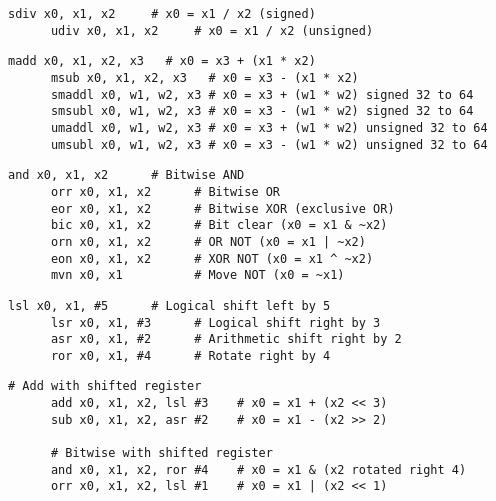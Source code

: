   \begin{definition}[Division]
    \begin{lstlisting}[language=arm]
      sdiv x0, x1, x2     # x0 = x1 / x2 (signed)
      udiv x0, x1, x2     # x0 = x1 / x2 (unsigned)
    \end{lstlisting}
  \end{definition}

  \begin{definition}
    \begin{lstlisting}[language=arm]
      madd x0, x1, x2, x3   # x0 = x3 + (x1 * x2)
      msub x0, x1, x2, x3   # x0 = x3 - (x1 * x2)
      smaddl x0, w1, w2, x3 # x0 = x3 + (w1 * w2) signed 32 to 64
      smsubl x0, w1, w2, x3 # x0 = x3 - (w1 * w2) signed 32 to 64
      umaddl x0, w1, w2, x3 # x0 = x3 + (w1 * w2) unsigned 32 to 64
      umsubl x0, w1, w2, x3 # x0 = x3 - (w1 * w2) unsigned 32 to 64
    \end{lstlisting}
  \end{definition}

  \begin{definition}
    \begin{lstlisting}[language=arm]
      and x0, x1, x2      # Bitwise AND
      orr x0, x1, x2      # Bitwise OR
      eor x0, x1, x2      # Bitwise XOR (exclusive OR)
      bic x0, x1, x2      # Bit clear (x0 = x1 & ~x2)
      orn x0, x1, x2      # OR NOT (x0 = x1 | ~x2)
      eon x0, x1, x2      # XOR NOT (x0 = x1 ^ ~x2)
      mvn x0, x1          # Move NOT (x0 = ~x1)
    \end{lstlisting}
  \end{definition}

  \begin{definition}
    \begin{lstlisting}[language=arm]
      lsl x0, x1, #5      # Logical shift left by 5
      lsr x0, x1, #3      # Logical shift right by 3
      asr x0, x1, #2      # Arithmetic shift right by 2
      ror x0, x1, #4      # Rotate right by 4
    \end{lstlisting}
  \end{definition}

  \begin{definition}
    \begin{lstlisting}[language=arm]
      # Add with shifted register
      add x0, x1, x2, lsl #3    # x0 = x1 + (x2 << 3)
      sub x0, x1, x2, asr #2    # x0 = x1 - (x2 >> 2)
      
      # Bitwise with shifted register  
      and x0, x1, x2, ror #4    # x0 = x1 & (x2 rotated right 4)
      orr x0, x1, x2, lsl #1    # x0 = x1 | (x2 << 1)
    \end{lstlisting}
  \end{definition}

